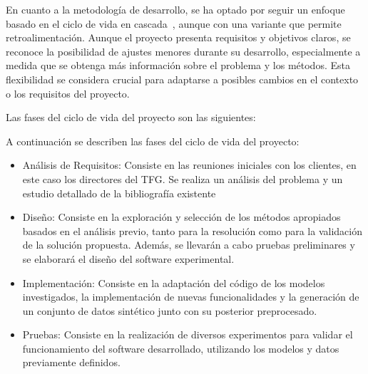 En cuanto a la metodología de desarrollo, se ha optado por seguir un enfoque basado en el ciclo de vida en cascada~\cite{38}, aunque con una variante que permite retroalimentación. Aunque el proyecto presenta requisitos y objetivos claros, se reconoce la posibilidad de ajustes menores durante su desarrollo, especialmente a medida que se obtenga más información sobre el problema y los métodos. Esta flexibilidad se considera crucial para adaptarse a posibles cambios en el contexto o los requisitos del proyecto.

Las fases del ciclo de vida del proyecto son las siguientes:

A continuación se describen las fases del ciclo de vida del proyecto:
\begin{itemize}
	\item Análisis de Requisitos: Consiste en las reuniones iniciales con los clientes, en este caso los directores del TFG. Se realiza un análisis del problema y un estudio detallado de la bibliografía existente
	\item Diseño: Consiste en la exploración y selección de los métodos apropiados basados en el análisis previo, tanto para la resolución como para la validación de la solución propuesta. Además, se llevarán a cabo pruebas preliminares y se elaborará el diseño del software experimental.
	\item Implementación: Consiste en la adaptación del código de los modelos investigados, la implementación de nuevas funcionalidades y la generación de un conjunto de datos sintético junto con su posterior preprocesado.
	\item Pruebas: Consiste en la realización de diversos experimentos para validar el funcionamiento del software desarrollado, utilizando los modelos y datos previamente definidos.
\end{itemize}

